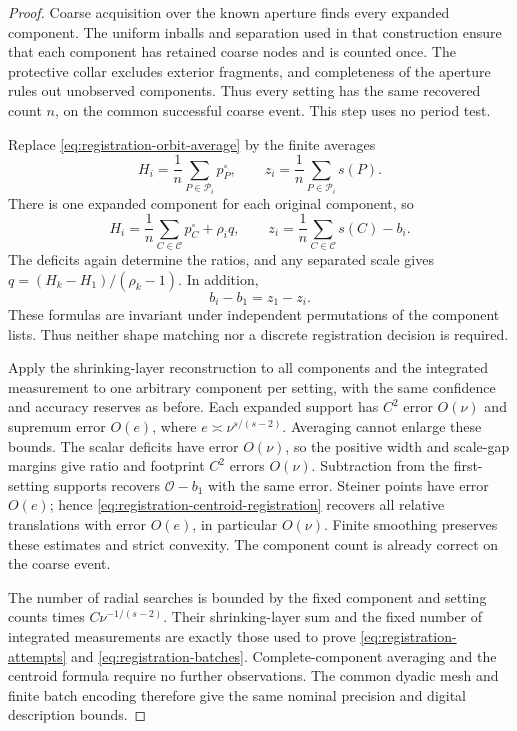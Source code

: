 \begin{proof}
Coarse acquisition over the known aperture finds every expanded
component. The uniform inballs and separation used in that
construction ensure that each component has retained coarse nodes
and is counted once. The protective collar excludes exterior
fragments, and completeness of the aperture rules out unobserved
components. Thus every setting has the same recovered count $n$,
on the common successful coarse event. This step uses no period
test.

Replace \eqref{eq:registration-orbit-average} by the finite averages
\[
 H_i=\frac1n\sum_{P\in\mathcal P_i}p_P^\circ,
       \qquad z_i=\frac1n\sum_{P\in\mathcal P_i}s(P).
\]
There is one expanded component for each original component, so
\begin{equation}\label{eq:registration-finite-cloud-identities}
 H_i=\frac1n\sum_{C\in\mathcal C}p_C^\circ+\rho_iq,
 \qquad
 z_i=\frac1n\sum_{C\in\mathcal C}s(C)-b_i.
\end{equation}
The deficits again determine the ratios, and any separated scale
gives $q=(H_k-H_1)/(\rho_k-1)$. In addition,
\begin{equation}\label{eq:registration-centroid-registration}
                         b_i-b_1=z_1-z_i.
\end{equation}
These formulas are invariant under independent permutations of the
component lists. Thus neither shape matching nor a discrete
registration decision is required.

Apply the shrinking-layer reconstruction to all components and
the integrated measurement to one arbitrary component per setting,
with the same confidence and accuracy reserves as before. Each
expanded support has $C^2$ error $O(\nu)$ and supremum error
$O(e)$, where $e\asymp\nu^{s/(s-2)}$. Averaging cannot enlarge
these bounds. The scalar deficits have error $O(\nu)$, so the
positive width and scale-gap margins give ratio and footprint
$C^2$ errors $O(\nu)$. Subtraction from the first-setting supports
recovers $\mathcal O-b_1$ with the same error. Steiner points have
error $O(e)$; hence \eqref{eq:registration-centroid-registration}
recovers all relative translations with error $O(e)$, in particular
$O(\nu)$. Finite smoothing preserves these estimates and strict
convexity. The component count is already correct on the coarse
event.

The number of radial searches is bounded by the fixed component
and setting counts times $C\nu^{-1/(s-2)}$. Their shrinking-layer
sum and the fixed number of integrated measurements are exactly
those used to prove \eqref{eq:registration-attempts} and
\eqref{eq:registration-batches}. Complete-component averaging and
the centroid formula require no further observations. The common
dyadic mesh and finite batch encoding therefore give the same
nominal precision and digital description bounds.
\end{proof}
